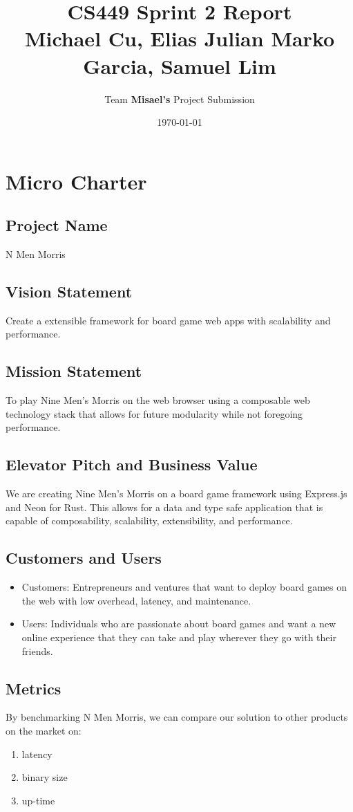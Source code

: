 \documentclass[11pt]{article}
\author{Team \textbf{Misael's} Project Submission}
\date{\today}
\title{CS449 Sprint 2 Report\\\medskip
\large Michael Cu, Elias Julian Marko Garcia, Samuel Lim}
\begin{document}
\maketitle
\tableofcontents


\section{Micro Charter}
\label{sec:orgdab0ecd}
\subsection{Project Name}
\label{sec:orgf84b588}
N Men Morris
\subsection{Vision Statement}
\label{sec:orgd00b525}
Create a extensible framework for board game web apps with scalability and performance.
\subsection{Mission Statement}
\label{sec:org8cfbf0c}
To play Nine Men's Morris on the web browser using a composable web technology stack that allows
for future modularity while not foregoing performance.
\subsection{Elevator Pitch and Business Value}
\label{sec:org7f1fd9d}
We are creating Nine Men's Morris on a board game framework using Express.js and Neon for
Rust. This allows for a data and type safe application that is capable of composability,
scalability, extensibility, and performance.
\subsection{Customers and Users}
\label{sec:org595f161}
\begin{itemize}
\item Customers: Entrepreneurs and ventures that want to deploy board games on the web with low
overhead, latency, and maintenance.
\item Users: Individuals who are passionate about board games and want a new online experience that
they can take and play wherever they go with their friends.
\end{itemize}
\subsection{Metrics}
\label{sec:org5c52d38}
By benchmarking N Men Morris, we can compare our solution to other products on the market on:
\begin{enumerate}
\item latency
\item binary size
\item up-time
\end{enumerate}
\end{document}
